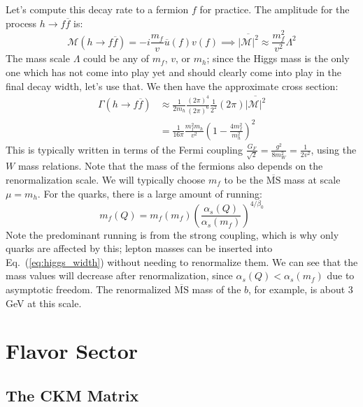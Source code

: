 \documentclass[11pt, oneside]{article}   	%
\theoremstyle{definition}
\numberwithin{equation}{subsection}		%
\begin{document}
Let's compute this decay rate to a fermion $f$ for practice. The amplitude for the process $h\rightarrow f\overline f$ is:
\begin{equation}
	\mathcal M(h\rightarrow f\overline f) = -i \frac{m_f}{v} \overline u(f) v(f) \implies \overline{|\mathcal M|^2}\approx \frac{m_f^2}{v^2}\Lambda^2
\end{equation}
The mass scale $\Lambda$ could be any of $m_f$, $v$, or $m_h$; since the Higgs mass is the only one which has not come into play 
yet and should clearly come into play in the final decay width, let's use that. We then have the approximate cross section:
\begin{align}
	\Gamma(h\rightarrow f\overline f) &\approx \frac{1}{2m_h} \frac{(2\pi)^4}{(2\pi)^6}\frac{1}{2^2} (2\pi) \overline{|\mathcal M|^2} \\
	&= \frac{1}{16\pi}\frac{m_f^2 m_h}{v^2} \left(1 - \frac{4 m_f^2}{m_h^2}\right)^2
\end{align}
This is typically written in terms of the Fermi coupling $\frac{G_F}{\sqrt 2} = \frac{g^2}{8 m_W^2} = \frac{1}{2v^2}$, using the $W$ mass relations.
Note that the mass of the fermions also depends on the renormalization scale. We will typically choose $m_f$ to be the $\overline{\mathrm{MS}}$ 
mass at scale $\mu = m_h$. For the quarks, there is a large amount of running:
\begin{equation}
	m_f(Q) = m_f(m_f)\left(\frac{\alpha_s(Q)}{\alpha_s(m_f)}\right)^{4 / \beta_0}
\end{equation}
Note the predominant running is from the strong coupling, which is why only quarks are affected by this; lepton masses 
can be inserted into Eq.~(\ref{eq:higgs_width}) without needing to renormalize them. We can see that the mass values will decrease 
after renormalization, since $\alpha_s(Q) < \alpha_s(m_f)$ due to asymptotic freedom. The renormalized $\overline{\mathrm{MS}}$ 
mass of the $b$, for example, is about 3 GeV at this scale. 



\newpage
\section{Flavor Sector}

\subsection{The CKM Matrix}
\end{document}

